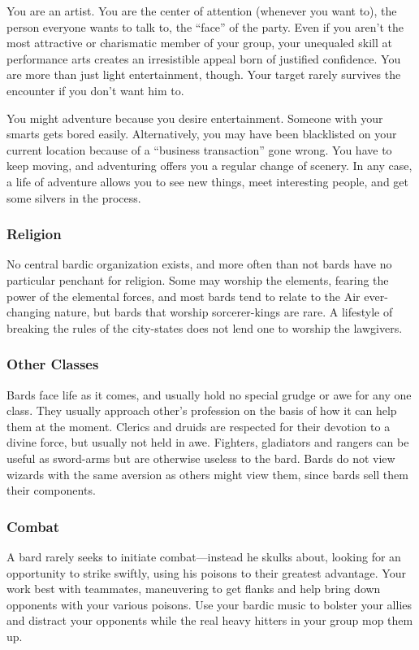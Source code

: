 You are an artist. You are the center of attention (whenever you want to), the person everyone wants to talk to, the ``face'' of the party. Even if you aren't the most attractive or charismatic member of your group, your unequaled skill at performance arts creates an irresistible appeal born of justified confidence. You are more than just light entertainment, though. Your target rarely survives the encounter if you don't want him to.

You might adventure because you desire entertainment. Someone with your smarts gets bored easily. Alternatively, you may have been blacklisted on your current location because of a ``business transaction'' gone wrong. You have to keep moving, and adventuring offers you a regular change of scenery. In any case, a life of adventure allows you to see new things, meet interesting people, and get some silvers in the process.

\subsubsection{Religion}
No central bardic organization exists, and more often than not bards have no particular penchant for religion. Some may worship the elements, fearing the power of the elemental forces, and most bards tend to relate to the Air ever-changing nature, but bards that worship sorcerer-kings are rare. A lifestyle of breaking the rules of the city-states does not lend one to worship the lawgivers.

\subsubsection{Other Classes}
Bards face life as it comes, and usually hold no special grudge or awe for any one class. They usually approach other's profession on the basis of how it can help them at the moment. Clerics and druids are respected for their devotion to a divine force, but usually not held in awe. Fighters, gladiators and rangers can be useful as sword-arms but are otherwise useless to the bard. Bards do not view wizards with the same aversion as others might view them, since bards sell them their components.

\subsubsection{Combat}
A bard rarely seeks to initiate combat---instead he skulks about, looking for an opportunity to strike swiftly, using his poisons to their greatest advantage. Your work best with teammates, maneuvering to get flanks and help bring down opponents with your various poisons. Use your bardic music to bolster your allies and distract your opponents while the real heavy hitters in your group mop them up.

